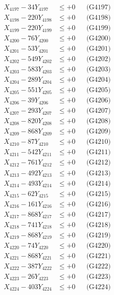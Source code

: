 \documentclass[a4paper,10pt]{article}
\begin{document}
{\begin{align}
X_{4197} - 34Y_{4197} &\leq +0 && \text{(G4197)} \\
X_{4198} - 220Y_{4198} &\leq +0 && \text{(G4198)} \\
X_{4199} - 220Y_{4199} &\leq +0 && \text{(G4199)} \\
X_{4200} - 76Y_{4200} &\leq +0 && \text{(G4200)} \\
\allowbreak
X_{4201} - 53Y_{4201} &\leq +0 && \text{(G4201)} \\
X_{4202} - 549Y_{4202} &\leq +0 && \text{(G4202)} \\
X_{4203} - 583Y_{4203} &\leq +0 && \text{(G4203)} \\
X_{4204} - 289Y_{4204} &\leq +0 && \text{(G4204)} \\
X_{4205} - 551Y_{4205} &\leq +0 && \text{(G4205)} \\
X_{4206} - 39Y_{4206} &\leq +0 && \text{(G4206)} \\
X_{4207} - 293Y_{4207} &\leq +0 && \text{(G4207)} \\
X_{4208} - 820Y_{4208} &\leq +0 && \text{(G4208)} \\
X_{4209} - 868Y_{4209} &\leq +0 && \text{(G4209)} \\
X_{4210} - 87Y_{4210} &\leq +0 && \text{(G4210)} \\
\allowbreak
X_{4211} - 542Y_{4211} &\leq +0 && \text{(G4211)} \\
X_{4212} - 761Y_{4212} &\leq +0 && \text{(G4212)} \\
X_{4213} - 492Y_{4213} &\leq +0 && \text{(G4213)} \\
X_{4214} - 493Y_{4214} &\leq +0 && \text{(G4214)} \\
X_{4215} - 62Y_{4215} &\leq +0 && \text{(G4215)} \\
X_{4216} - 161Y_{4216} &\leq +0 && \text{(G4216)} \\
X_{4217} - 868Y_{4217} &\leq +0 && \text{(G4217)} \\
X_{4218} - 741Y_{4218} &\leq +0 && \text{(G4218)} \\
X_{4219} - 868Y_{4219} &\leq +0 && \text{(G4219)} \\
X_{4220} - 74Y_{4220} &\leq +0 && \text{(G4220)} \\
\allowbreak
X_{4221} - 868Y_{4221} &\leq +0 && \text{(G4221)} \\
X_{4222} - 387Y_{4222} &\leq +0 && \text{(G4222)} \\
X_{4223} - 26Y_{4223} &\leq +0 && \text{(G4223)} \\
X_{4224} - 403Y_{4224} &\leq +0 && \text{(G4224)} \\

\end{align}}
\end{document}
